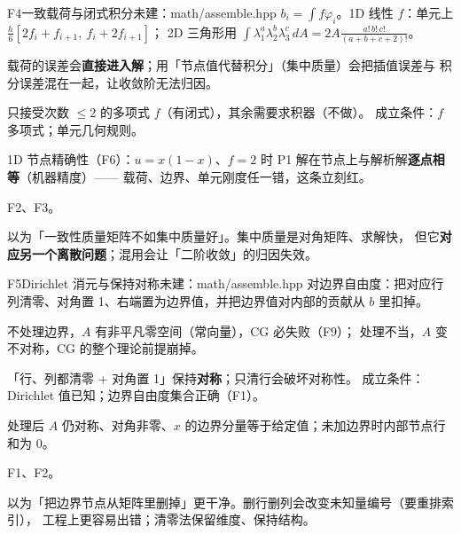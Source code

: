 \begin{know}{F4}{一致载荷与闭式积分}{未建：math/assemble.hpp}
 $b_i=\int f\varphi_i$。1D 线性 $f$：单元上 $\frac h6[2f_i+f_{i+1},\ f_i+2f_{i+1}]$；
2D 三角形用 $\int\lambda_1^{a}\lambda_2^{b}\lambda_3^{c}\,dA=2A\frac{a!\,b!\,c!}{(a+b+c+2)!}$。

 载荷的误差会\textbf{直接进入解}；用「节点值代替积分」（集中质量）会把插值误差与
积分误差混在一起，让收敛阶无法归因。

 只接受次数 $\le2$ 的多项式 $f$（有闭式），其余需要求积器（不做）。
成立条件：$f$ 多项式；单元几何规则。

 1D 节点精确性（F6）：$u=x(1-x)$、$f=2$ 时 P1 解在节点上与解析解\textbf{逐点相等}（机器精度）——
载荷、边界、单元刚度任一错，这条立刻红。

 F2、F3。

 以为「一致性质量矩阵不如集中质量好」。集中质量是对角矩阵、求解快，
但它\textbf{对应另一个离散问题}；混用会让「二阶收敛」的归因失效。
\end{know}

\begin{know}{F5}{Dirichlet 消元与保持对称}{未建：math/assemble.hpp}
 对边界自由度：把对应行列清零、对角置 1、右端置为边界值，并把边界值对内部的贡献从 $b$ 里扣掉。

 不处理边界，$A$ 有非平凡零空间（常向量），CG 必失败（F9）；
处理不当，$A$ 变不对称，CG 的整个理论前提崩掉。

 「行、列都清零 + 对角置 1」保持\textbf{对称}；只清行会破坏对称性。
成立条件：Dirichlet 值已知；边界自由度集合正确（F1）。

 处理后 $A$ 仍对称、对角非零、$x$ 的边界分量等于给定值；未加边界时内部节点行和为 0。

 F1、F2。

 以为「把边界节点从矩阵里删掉」更干净。删行删列会改变未知量编号（要重排索引），
工程上更容易出错；清零法保留维度、保持结构。
\end{know}

